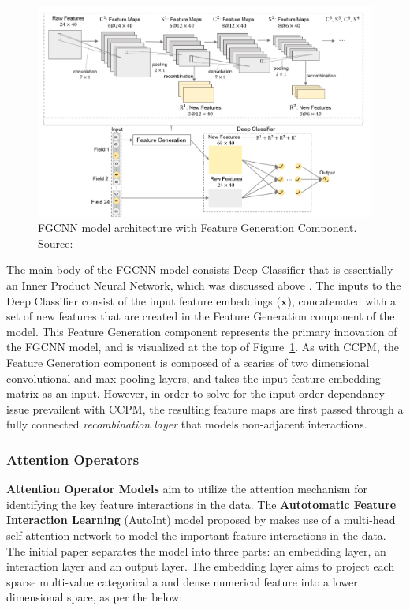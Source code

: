 \documentclass{mldsmsc}
\begin{document}
\begin{figure}[h]
    \centering
    \includegraphics[width=\textwidth]{../figures/fgcnn.png}
    \caption{FGCNN model architecture with Feature Generation Component. Source: \citep{RefWorks:liu2019feature}}
    \label{fig:fgcnn}
\end{figure}

The main body of the FGCNN model consists Deep Classifier that is essentially an Inner Product
Neural Network, which was discussed above \citep{RefWorks:qu2018product-based}. The inputs
to the Deep Classifier consist of the input feature embeddings ($\tilde{\mathbf{x}}$), concatenated
with a set of new features that are created in the Feature Generation component of the model. This
Feature Generation component represents the primary innovation of the FGCNN model, and is visualized
at the top of Figure~\ref{fig:fgcnn}. As with CCPM, the Feature Generation component is composed of
a searies of two dimensional convolutional and max pooling layers, and takes the input feature
embedding matrix as an input. However, in order to solve for the input order dependancy issue
prevailent with CCPM, the resulting feature maps are first passed through a fully connected \emph{recombination layer}
that models non-adjacent interactions.

\subsubsection{Attention Operators}

\textbf{Attention Operator Models} aim to utilize the attention mechanism for identifying
the key feature interactions in the data. The \textbf{Autotomatic Feature Interaction Learning} (AutoInt) 
model proposed by \cite{RefWorks:song2019autoint} makes use of a multi-head self attention
network to model the important feature interactions in the data. The initial 
paper separates the model into three parts: an embedding layer, an interaction layer 
and an output layer. The embedding layer aims to project each sparse multi-value
categorical a and dense numerical feature into a lower dimensional space, as per the below:
\end{document}
